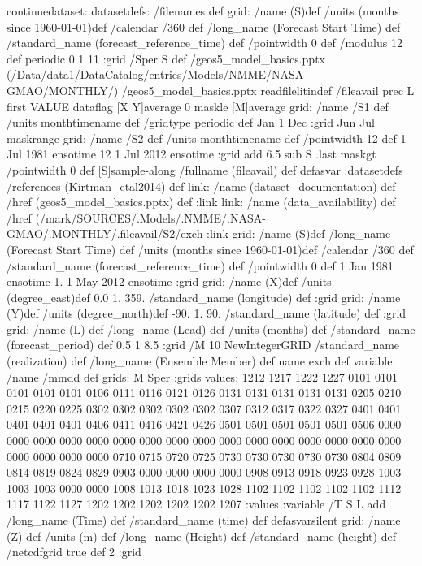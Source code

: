 \begin{ingrid}
continuedataset:
datasetdefs:
/filenames {
} def
grid:
/name (S)def
/units (months since 1960-01-01)def
/calendar /360 def
/long_name (Forecast Start Time) def
/standard_name (forecast_reference_time) def
/pointwidth 0 def
/modulus 12 def
periodic
0 1 11
:grid
/Sper S def
/geos5_model_basics.pptx { (/Data/data1/DataCatalog/entries/Models/NMME/NASA-GMAO/MONTHLY/) /geos5_model_basics.pptx readfilelitin}def
/fileavail
{
prec 
   L first VALUE
   dataflag
   [X Y]average
   0 maskle
   [M]average
   grid:
     /name /S1 def
     /units monthtimename def
     /gridtype periodic def
     Jan 1 Dec :grid
    Jun Jul maskrange
    grid:
      /name /S2 def
      /units monthtimename def
      /pointwidth 12 def
      1
       Jul 1981 ensotime
       12 1
         Jul 2012 ensotime
         :grid
     add
    6.5 sub
    S .last maskgt
    /pointwidth 0 def
    [S]sample-along
/fullname (fileavail) def
} defasvar
:datasetdefs
/references (Kirtman_etal2014) def
link:
/name (dataset_documentation) def
/href (geos5_model_basics.pptx) def
:link
link:
/name (data_availability) def
/href (/mark/SOURCES/.Models/.NMME/.NASA-GMAO/.MONTHLY/.fileavail/S2/exch%
:link
grid:
/name (S)def
/long_name (Forecast Start Time) def
/units (months since 1960-01-01)def
/calendar /360 def
/standard_name (forecast_reference_time) def
/pointwidth 0 def
1 Jan 1981 ensotime
1.
1 May 2012 ensotime %
:grid
grid:
/name (X)def
/units (degree_east)def
 0.0 1. 359.
/standard_name (longitude) def
:grid
grid:
/name (Y)def
/units (degree_north)def
 -90. 1. 90.
/standard_name (latitude) def
:grid
grid:
/name (L) def
/long_name (Lead) def
/units (months) def
/standard_name (forecast_period) def
0.5 1 8.5
:grid
/M 10 NewIntegerGRID
/standard_name (realization) def
/long_name (Ensemble Member) def
 name exch def
variable:
/name /mmdd def
grids: M Sper :grids
values:
1212 1217 1222 1227 0101 0101 0101 0101 0101 0106
0111 0116 0121 0126 0131 0131 0131 0131 0131 0205
0210 0215 0220 0225 0302 0302 0302 0302 0302 0307
0312 0317 0322 0327 0401 0401 0401 0401 0401 0406
0411 0416 0421 0426 0501 0501 0501 0501 0501 0506
0000 0000 0000 0000 0000 0000 0000 0000 0000 0000
0000 0000 0000 0000 0000 0000 0000 0000 0000 0000
0710 0715 0720 0725 0730 0730 0730 0730 0730 0804
0809 0814 0819 0824 0829 0903 0000 0000 0000 0000
0908 0913 0918 0923 0928 1003 1003 1003 0000 0000
1008 1013 1018 1023 1028 1102 1102 1102 1102 1102
1112 1117 1122 1127 1202 1202 1202 1202 1202 1207
:values
:variable
/T { S L add
/long_name (Time) def
/standard_name (time) def } defasvarsilent
grid:
/name (Z) def
/units (m) def
/long_name (Height) def
/standard_name (height) def
/netcdfgrid true def
2 :grid
\end{ingrid}
